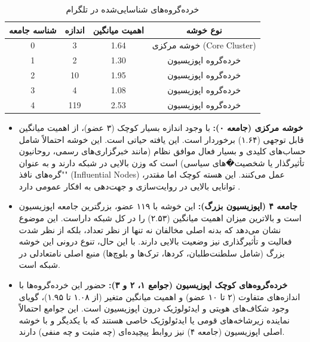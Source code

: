 \documentclass{article}
\begin{document}
	\begin{table}[h!]
		\centering
		\caption{خرده‌گروه‌های شناسایی‌شده در تلگرام}
		\label{tab:communities_telegram}
		\begin{tabular}{@{}cccc@{}}
			\toprule
			\textbf{شناسه جامعه} & \textbf{اندازه} & \textbf{اهمیت میانگین} & \textbf{نوع خوشه} \\ \midrule
			0                    & 3                & 1.64                   & خوشه مرکزی (Core Cluster) \\
			1                    & 2                & 1.30                   & خرده‌گروه اپوزیسیون \\
			2                    & 10               & 1.95                   & خرده‌گروه اپوزیسیون \\
			3                    & 4                & 1.08                   & خرده‌گروه اپوزیسیون \\
			4                    & 119              & 2.53                   & خرده‌گروه اپوزیسیون \\ \bottomrule
		\end{tabular}
	\end{table}
	
	\begin{itemize}
		\item \textbf{خوشه مرکزی (جامعه ۰):} با وجود اندازه بسیار کوچک (۳ عضو)، از اهمیت میانگین قابل توجهی (۱.۶۴) برخوردار است. این یافته حیاتی است. این خوشه احتمالاً شامل حساب‌های کلیدی و بسیار فعال موافق نظام (مانند خبرگزاری‌های رسمی، روحانیون تأثیرگذار یا شخصیت�های سیاسی) است که وزن بالایی در شبکه دارند و به عنوان "گره‌های نافذ" (Influential Nodes) عمل می‌کنند. این هسته کوچک اما مقتدر، توانایی بالایی در روایت‌سازی و جهت‌دهی به افکار عمومی دارد .
		\item \textbf{جامعه ۴ (اپوزیسیون بزرگ):} این خوشه با ۱۱۹ عضو، بزرگترین جامعه اپوزیسیون است و بالاترین میزان اهمیت میانگین (۲.۵۳) را در کل شبکه داراست. این موضوع نشان می‌دهد که بدنه اصلی مخالفان نه تنها از نظر تعداد، بلکه از نظر شدت فعالیت و تأثیرگذاری نیز وضعیت بالایی دارند. با این حال، تنوع درونی این خوشه بزرگ (شامل سلطنت‌طلبان، کردها، ترک‌ها و بلوچ‌ها) منبع اصلی نامتعادلی در شبکه است.
		\item \textbf{خرده‌گروه‌های کوچک اپوزیسیون (جوامع ۱، ۲ و ۳):} حضور این خرده‌گروه‌ها با اندازه‌های متفاوت (۲ تا ۱۰ عضو) و اهمیت میانگین متغیر (از ۱.۰۸ تا ۱.۹۵)، گویای وجود شکاف‌های هویتی و ایدئولوژیک درون اپوزیسیون است. این جوامع احتمالاً نماینده زیرشاخه‌های قومی یا ایدئولوژیک خاصی هستند که با یکدیگر و با خوشه اصلی اپوزیسیون (جامعه ۴) نیز روابط پیچیده‌ای (چه مثبت و چه منفی) دارند.
	\end{itemize}
	
\end{document}
